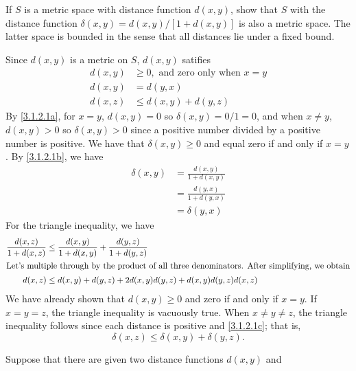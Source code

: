 \begin{exercise}[ref = \arabic{exercisei}]
\item
  \label{3.1.2.1}
  If \(S\) is a metric space with distance function \(d(x,y)\), show that \(S\)
  with the distance function \(\delta(x,y) = d(x,y)/[1 + d(x,y)]\) is also a
  metric space.
  The latter space is bounded in the sense that all distances lie under a fixed
  bound.
  \par\smallskip
  Since \(d(x,y)\) is a metric on \(S\), \(d(x,y)\) satifies
  \begin{subequations}
    \begin{align}
      d(x, y) & \geq 0,\text{  and zero only when \(x = y\)}\label{3.1.2.1a}\\
      d(x, y) & = d(y, x)\label{3.1.2.1b}\\
      d(x, z) & \leq d(x, y) + d(y, z)\label{3.1.2.1c}
    \end{align}
  \end{subequations}
  By \cref{3.1.2.1a}, for \(x = y\), \(d(x,y) = 0\) so
  \(\delta(x,y) = 0/1 = 0\), and when \(x\neq y\), \(d(x,y) > 0\) so
  \(\delta(x,y) > 0\) since a positive number divided by a positive number is
  positive.
  We have that \(\delta(x,y)\geq 0\) and equal zero if and only if \(x = y\).
  By \cref{3.1.2.1b}, we have
  \begin{align*}
    \delta(x, y) & = \frac{d(x, y)}{1 + d(x, y)}\\
                 & = \frac{d(y, x)}{1 + d(y, x)}\\
                 & = \delta(y, x)
  \end{align*}
  For the triangle inequality, we have
  \begin{align*}
    \frac{d(x, z)}{1 + d(x, z)}
    & \leq \frac{d(x, y)}{1 + d(x, y)} + \frac{d(y, z)}{1 + d(y, z)}\\
    \intertext{Let's multiple through by the product of all three
    denominators.
    After simplifying, we obtain}
    d(x, z) & \leq d(x, y) + d(y,z) + 2d(x, y)d(y, z) + d(x, y)d(y, z)d(x, z)
  \end{align*}
  We have already shown that \(d(x,y)\geq 0\) and zero if and only if
  \(x = y\).
  If \(x = y = z\), the triangle inequality is vacuously true.
  When \(x\neq y\neq z\), the triangle inequality follows since each distance
  is positive and \cref{3.1.2.1c}; that is,
  \[
  \delta(x, z)\leq \delta(x, y) + \delta(y, z).
  \]
\item
  Suppose that there are given two distance functions \(d(x,y)\) and

\end{exercise}

